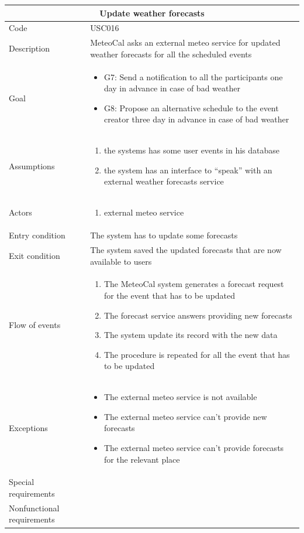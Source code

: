 \documentclass[10pt,a4paper,titlepage]{article}
\begin{document}
\begin{tabular}[h]{| p{3cm} | p{10cm} |} 
\hline \multicolumn{2}{|c|}{\textbf{Update weather forecasts}} \\  
\hline Code & USC016\\  
\hline Description & MeteoCal asks an external meteo service for updated weather forecasts for all the scheduled events\\ 
\hline Goal & \begin{itemize}
\item G7: Send a notification to all the participants one day in advance in case of bad weather
\item G8: Propose an alternative schedule to the event creator three day in advance in case of bad weather
\end{itemize}\\
\hline Assumptions  & \begin{enumerate} 
\item the systems has some user events in his database
\item the system has an interface to “speak” with an external weather forecasts service
\end{enumerate} \\ 
\hline Actors &  \begin{enumerate} 
\item external meteo service
\end{enumerate} \\ 
\hline Entry condition & The system has to update some forecasts\\ 
\hline Exit condition & The system saved the updated forecasts that are now available to users\\ 
\hline Flow of events & \begin{enumerate} 
\item The MeteoCal system generates a forecast request for the event that has to be updated
\item The forecast service answers providing new forecasts
\item The system update its record with the new data
\item The procedure is repeated for all the event that has to be updated
\end{enumerate}\\ 
\hline Exceptions & \begin{itemize}
\item  The external meteo service is not available
\item The external meteo service can’t provide new forecasts
\item The external meteo service can’t provide forecasts for the relevant place
\end{itemize}\\ 
\hline Special requirements &\\ 
\hline Nonfunctional requirements &\\ 
\hline 
\end{tabular} 
\end{document}
